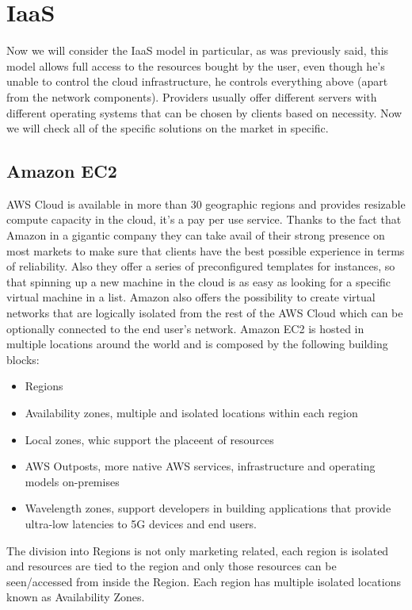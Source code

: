 \chapter{IaaS}
Now we will consider the IaaS model in particular, as was previously said, this model allows full access to the resources bought by the user, even though he's unable to control the cloud infrastructure, he controls everything above (apart from the network components). \n
Providers usually offer different servers with different operating systems that can be chosen by clients based on necessity. \n
Now we will check all of the specific solutions on the market in specific.
\section{Amazon EC2}
AWS Cloud is available in more than 30 geographic regions and provides resizable compute capacity in the cloud, it's a pay per use service. \n
Thanks to the fact that Amazon in a gigantic company they can take avail of their strong presence on most markets to make sure that clients have the best possible experience in terms of reliability. \n
Also they offer a series of preconfigured templates for instances, so that spinning up a new machine in the cloud is as easy as looking for a specific virtual machine in a list. Amazon also offers the possibility to create virtual networks that are logically isolated from the rest of the AWS Cloud which can be optionally connected to the end user's network. \n
Amazon EC2 is hosted in multiple locations around the world and is composed by the following building blocks:
\begin{itemize}
    \item Regions
    \item Availability zones, multiple and isolated locations within each region
    \item Local zones, whic support the placeent of resources
    \item AWS Outposts, more native AWS services, infrastructure and operating models on-premises
    \item Wavelength zones, support developers in building applications that provide ultra-low latencies to 5G devices and end users.
\end{itemize}
The division into Regions is not only marketing related, each region is isolated and resources are tied to the region and only those resources can be seen/accessed from inside the Region. Each region has multiple isolated locations known as Availability Zones. \n
